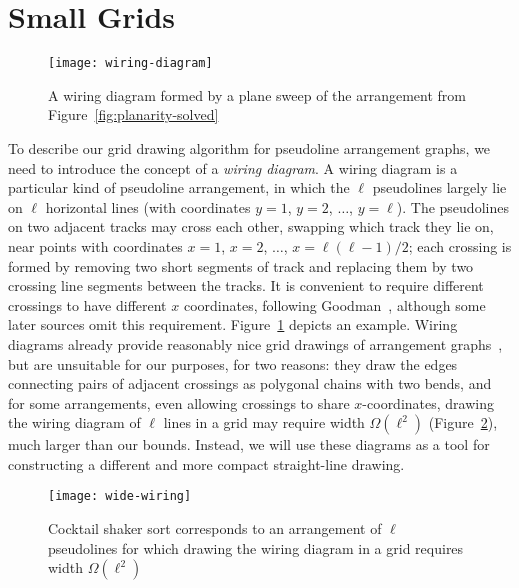 \documentclass[oribibl]{llncs}
\begin{document}
\section{Small Grids}
\label{sec:grid}

\begin{figure}[b]
\centering\texttt{[image: wiring-diagram]}
\caption{A wiring diagram formed by a plane sweep of the arrangement from Figure~\ref{fig:planarity-solved}}
\label{fig:wiring-diagram}
\end{figure}

To describe our grid drawing algorithm for pseudoline arrangement graphs, we need to introduce the concept of a \emph{wiring diagram}. A wiring diagram is a particular kind of pseudoline arrangement, in which the $\ell$ pseudolines largely lie on $\ell$ horizontal lines (with coordinates $y=1$, $y=2$, $\dots$, $y=\ell$).  The pseudolines on two adjacent tracks may cross each other, swapping which track they lie on, near points with coordinates $x=1$, $x=2$, $\dots$, $x=\ell(\ell-1)/2$; each crossing is formed by removing two short segments of track and replacing them by two crossing line segments between the tracks. It is convenient to require different crossings to have different $x$ coordinates, following Goodman~\cite{Goo-DM-80}, although some later sources omit this requirement. Figure~\ref{fig:wiring-diagram} depicts an example. Wiring diagrams already provide reasonably nice grid drawings of arrangement graphs~\cite{MutSahPat-01}, but are unsuitable for our purposes, for two reasons: they draw the edges connecting pairs of adjacent crossings as polygonal chains with two bends, and for some arrangements,  even allowing crossings to share $x$-coordinates, drawing the wiring diagram of $\ell$ lines in a grid may require width $\Omega(\ell^2)$ (Figure~\ref{fig:wide-wiring}), much larger than our bounds. Instead, we will use these diagrams as a tool for constructing a different and more compact straight-line drawing.

\begin{figure}[t]
\centering\texttt{[image: wide-wiring]}
\caption{Cocktail shaker sort corresponds to an arrangement of $\ell$ pseudolines for which drawing the wiring diagram in a grid requires width $\Omega(\ell^2)$}
\label{fig:wide-wiring}
\end{figure}
\end{document}
